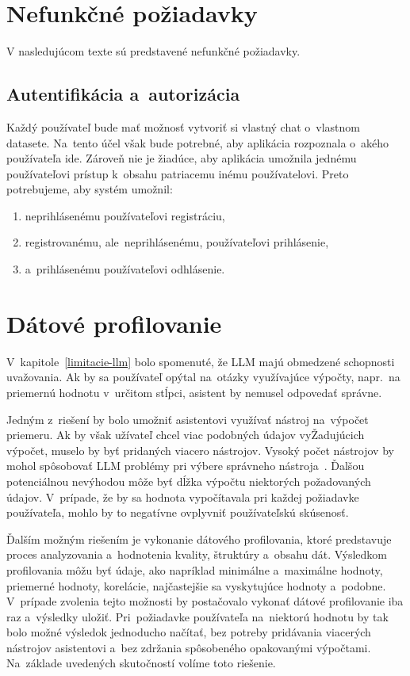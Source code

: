 \section{Nefunkčné požiadavky}

V nasledujúcom texte sú predstavené nefunkčné požiadavky.

\subsection{Autentifikácia a~autorizácia}
\label{auth-n-auth}

Každý používateľ bude mať možnosť vytvoriť si vlastný chat o~vlastnom datasete. Na~tento účel však bude potrebné, aby aplikácia rozpoznala o~akého používateľa ide. Zároveň nie je žiadúce, aby aplikácia umožnila jednému používateľovi prístup k~obsahu patriacemu inému používatelovi. Preto potrebujeme, aby systém umožnil:
\begin{enumerate}
\item neprihlásenému používateľovi registráciu,
\item registrovanému, ale~neprihlásenému, používateľovi prihlásenie,
\item a~prihlásenému používateľovi odhlásenie.
\end{enumerate}

\section{Dátové profilovanie}

V~kapitole~\ref{limitacie-llm} bolo spomenuté, že LLM majú obmedzené schopnosti uvažovania. Ak by sa používateľ opýtal na~otázky využívajúce výpočty, napr.~na~ priemernú hodnotu v~určitom stĺpci, asistent by nemusel odpovedať správne.

Jedným z~riešení by bolo umožniť asistentovi využívať nástroj na~výpočet priemeru. Ak by však užívateľ chcel viac podobných údajov vyŽadujúcich výpočet, muselo by byť pridaných viacero nástrojov. Vysoký počet nástrojov by mohol spôsobovať LLM problémy pri výbere správneho nástroja~\cite{too-many-tools}. Ďalšou potenciálnou nevýhodou môže byť dĺžka výpočtu niektorých požadovaných údajov. V~prípade, že by sa hodnota vypočítavala pri každej požiadavke používateľa, mohlo by to negatívne ovplyvniť používateľskú skúsenosť.

Ďalším možným riešením je vykonanie dátového profilovania, ktoré predstavuje proces analyzovania a~hodnotenia kvality, štruktúry a~obsahu dát. Výsledkom profilovania môžu byť údaje, ako napríklad minimálne a~maximálne hodnoty, priemerné hodnoty, korelácie, najčastejšie sa vyskytujúce hodnoty a~podobne. V~prípade zvolenia tejto možnosti by postačovalo vykonať dátové profilovanie iba raz a~výsledky uložiť. Pri~požiadavke používateľa na~niektorú hodnotu by tak bolo možné výsledok jednoducho načítať, bez potreby pridávania viacerých nástrojov asistentovi a~bez zdržania spôsobeného opakovanými výpočtami. Na~základe uvedených skutočností volíme toto riešenie.

